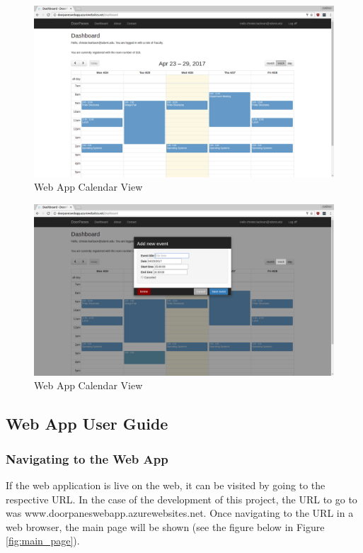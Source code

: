 \begin{figure}
\centering
  \includegraphics[scale=0.3]{DesignImages/UserGuideImagesWebApp/calendar_view.png}
  \caption{Web App Calendar View}
  \label{fig:calendar_view}
\end{figure}

\begin{figure}
\centering
  \includegraphics[scale=0.3]{DesignImages/UserGuideImagesWebApp/drag_event.png}
  \caption{Web App Calendar View}
  \label{fig:drag_event}
\end{figure}

\subsection{Web App User Guide} 
\subsubsection{Navigating to the Web App}
If the web application is live on the web, it can be visited by going to the respective URL. In the case of the development of this project, the URL to go to was www.doorpaneswebapp.azurewebsites.net. Once navigating to the URL in a web browser, the main page will be shown (see the figure below in Figure \ref{fig:main_page}).

